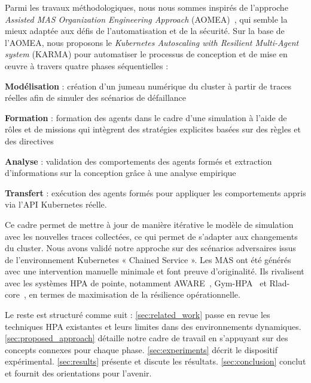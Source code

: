 Parmi les travaux méthodologiques, nous nous sommes inspirés de l'approche \textit{Assisted MAS Organization Engineering Approach} (AOMEA)~\cite{soule2024aomea}, qui semble la mieux adaptée aux défis de l'automatisation et de la sécurité. Sur la base de l'AOMEA, nous proposons le \textit{Kubernetes Autoscaling with Resilient Multi-Agent system} (KARMA) pour automatiser le processus de conception et de mise en œuvre à travers quatre phases séquentielles :
\begin{enumerate*}[label=\textbf{\arabic*)}, itemjoin={;\quad }]
    \item \textbf{Modélisation} : création d'un jumeau numérique du cluster à partir de traces réelles afin de simuler des scénarios de défaillance
    \item \textbf{Formation} : formation des agents dans le cadre d'une simulation à l'aide de rôles et de missions qui intègrent des stratégies explicites basées sur des règles et des directives
    \item \textbf{Analyse} : validation des comportements des agents formés et extraction d'informations sur la conception grâce à une analyse empirique
    \item \textbf{Transfert} : exécution des agents formés pour appliquer les comportements appris via l'API Kubernetes réelle.
\end{enumerate*}

Ce cadre permet de mettre à jour de manière itérative le modèle de simulation avec les nouvelles traces collectées, ce qui permet de s'adapter aux changements du cluster. Nous avons validé notre approche sur des scénarios adversaires issus de l'environnement Kubernetes « Chained Service ». Les MAS ont été générés avec une intervention manuelle minimale et font preuve d'originalité. Ils rivalisent avec les systèmes HPA de pointe, notamment AWARE~\cite{aware2023}, Gym-HPA~\cite{gymhpa2022} et Rlad-core~\cite{Rossi2019}, en termes de maximisation de la résilience opérationnelle.

Le reste est structuré comme suit :
\autoref{sec:related_work} passe en revue les techniques HPA existantes et leurs limites dans des environnements dynamiques.
\autoref{sec:proposed_approach} détaille notre cadre de travail en s'appuyant sur des concepts connexes pour chaque phase.
\autoref{sec:experiments} décrit le dispositif expérimental.
\autoref{sec:results} présente et discute les résultats.
\autoref{sec:conclusion} conclut et fournit des orientations pour l'avenir.

